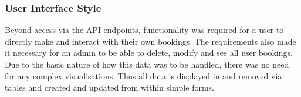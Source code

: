 \subsubsection{User Interface Style}
\par 
Beyond access via the API endpoints, functionality was required for a user to directly make and interact with their own bookings. The requirements also made it necessary for an admin to be able to delete, modify and see all user bookings. Due to the basic nature of how this data was to be handled, there was no need for any complex visualisations. Thus all data is displayed in and removed via tables and created and updated from within simple forms. 
